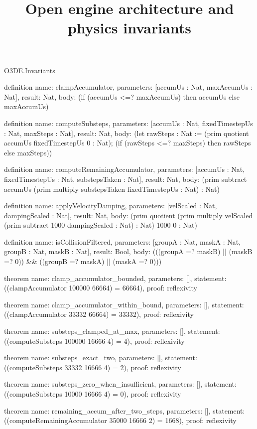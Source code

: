 \begin{lexlean}{O3DE.Invariants}
\title{Open engine architecture and physics invariants}
\begin{semanticmodule}
definition{
  name: clampAccumulator,
  parameters: [accumUs : Nat, maxAccumUs : Nat],
  result: Nat,
  body: (if (accumUs <=? maxAccumUs) then accumUs else maxAccumUs)
}

definition{
  name: computeSubsteps,
  parameters: [accumUs : Nat, fixedTimestepUs : Nat, maxSteps : Nat],
  result: Nat,
  body: (let rawSteps : Nat := (prim quotient accumUs fixedTimestepUs 0 : Nat); (if (rawSteps <=? maxSteps) then rawSteps else maxSteps))
}

definition{
  name: computeRemainingAccumulator,
  parameters: [accumUs : Nat, fixedTimestepUs : Nat, substepsTaken : Nat],
  result: Nat,
  body: (prim subtract accumUs (prim multiply substepsTaken fixedTimestepUs : Nat) : Nat)
}

definition{
  name: applyVelocityDamping,
  parameters: [velScaled : Nat, dampingScaled : Nat],
  result: Nat,
  body: (prim quotient (prim multiply velScaled (prim subtract 1000 dampingScaled : Nat) : Nat) 1000 0 : Nat)
}

definition{
  name: isCollisionFiltered,
  parameters: [groupA : Nat, maskA : Nat, groupB : Nat, maskB : Nat],
  result: Bool,
  body: (((groupA =? maskB) || (maskB =? 0)) && ((groupB =? maskA) || (maskA =? 0)))
}

theorem{
  name: clamp_accumulator_bounded,
  parameters: [],
  statement: ((clampAccumulator 100000 66664) = 66664),
  proof: reflexivity{}
}

theorem{
  name: clamp_accumulator_within_bound,
  parameters: [],
  statement: ((clampAccumulator 33332 66664) = 33332),
  proof: reflexivity{}
}

theorem{
  name: substeps_clamped_at_max,
  parameters: [],
  statement: ((computeSubsteps 100000 16666 4) = 4),
  proof: reflexivity{}
}

theorem{
  name: substeps_exact_two,
  parameters: [],
  statement: ((computeSubsteps 33332 16666 4) = 2),
  proof: reflexivity{}
}

theorem{
  name: substeps_zero_when_insufficient,
  parameters: [],
  statement: ((computeSubsteps 10000 16666 4) = 0),
  proof: reflexivity{}
}

theorem{
  name: remaining_accum_after_two_steps,
  parameters: [],
  statement: ((computeRemainingAccumulator 35000 16666 2) = 1668),
  proof: reflexivity{}
}


\end{semanticmodule}
\end{lexlean}

